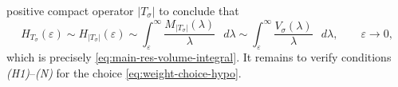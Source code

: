 \documentclass[a4paper,12pt]{article}
\newcommand{\diff}{\mathop{}\!d}
\begin{document}
positive compact operator \(|T_\sigma|\) to conclude that
\begin{equation}\label{eq:mainr-result-for-Weyl-1}
    H_{T_\sigma}(\varepsilon)
    \sim H_{|T_\sigma|}(\varepsilon)  
    \sim \int_{\varepsilon}^{\infty}
        \frac{M_{|T_\sigma|}(\lambda)}{\lambda}\,\diff\lambda \nonumber 
    \sim \int_{\varepsilon}^{\infty}
        \frac{V_\sigma(\lambda)}{\lambda}\,\diff\lambda,
    \qquad \varepsilon\to0,%
\end{equation}
which is precisely \eqref{eq:main-res-volume-integral}.
It remains to verify conditions \emph{(H1)}–\emph{(N)} for the choice
\eqref{eq:weight-choice-hypo}.
\color{black}
\fi 
\end{document}
